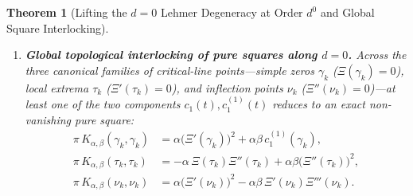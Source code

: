 \documentclass[11pt,reqno]{amsart}
\newtheorem{theorem}{Theorem}[section]
\theoremstyle{definition}
\theoremstyle{remark}
\numberwithin{equation}{section}
\newcommand{\ii}{\mathrm{i}}
\begin{document}
\begin{theorem}[Lifting the $d=0$ Lehmer Degeneracy at Order $d^0$ and Global Square Interlocking]
\begin{enumerate}[label=\textup{(\roman*)},leftmargin=2.2em]
\begin{equation}
\end{equation}
which converges as $\delta \to 0$ to the strictly positive critical-line floor $+\alpha\beta(\Xi''(t_0))^2 > 0$. Furthermore, in a two-dimensional neighborhood $(d, t_{\mathrm{mid}} + \tau)$ around $(0, t_{\mathrm{mid}})$, $K_{\alpha,\beta}$ forms a lifted quadratic bowl with a strictly positive spectral gap:
\begin{equation}\label{eq:lifted_2d_lehmer_bowl}
\begin{aligned}
\pi\,K_{\alpha,\beta}(t_{\mathrm{mid}} + \tau - \ii d,\, t_{\mathrm{mid}} + \tau - \ii d) &= \alpha\beta\bigl(\Xi''(t_{\mathrm{mid}})\bigr)^2 + \frac{\alpha}{2}\bigl(\Xi''(t_{\mathrm{mid}})\bigr)^2\bigl(\delta^2 + \tau^2 + d^2\bigr) \\
&\quad + \mathcal{O}\bigl(\beta|\tau| + (\delta + |\tau| + d)^3\bigr) > 0.
\end{aligned}
\end{equation}
\item \textbf{Global topological interlocking of pure squares along $d = 0$.} Across the three canonical families of critical-line points---simple zeros $\gamma_k$ ($\Xi(\gamma_k) = 0$), local extrema $\tau_k$ ($\Xi'(\tau_k) = 0$), and inflection points $\nu_k$ ($\Xi''(\nu_k) = 0$)---at least one of the two components $c_1(t), c_1^{(1)}(t)$ reduces to an exact non-vanishing pure square:
\begin{equation}\label{eq:square_interlocking_triad}
\begin{aligned}
\pi\,K_{\alpha,\beta}(\gamma_k, \gamma_k) &= \alpha\bigl(\Xi'(\gamma_k)\bigr)^2 + \alpha\beta\,c_1^{(1)}(\gamma_k), \\
\pi\,K_{\alpha,\beta}(\tau_k, \tau_k) &= -\alpha\,\Xi(\tau_k)\Xi''(\tau_k) + \alpha\beta\bigl(\Xi''(\tau_k)\bigr)^2, \\
\pi\,K_{\alpha,\beta}(\nu_k, \nu_k) &= \alpha\bigl(\Xi'(\nu_k)\bigr)^2 - \alpha\beta\,\Xi'(\nu_k)\Xi'''(\nu_k).
\end{aligned}
\end{equation}
\end{enumerate}
\end{theorem}
\end{document}
